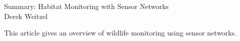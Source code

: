 \documentclass[12pt]{article}
\begin{document}
\begin{center}
{\huge Summary: Habitat Monitoring with Sensor Networks } \\
Derek Weitzel
\end{center}

This article gives an overview of wildlife monitoring using sensor networks.  
\end{document}
